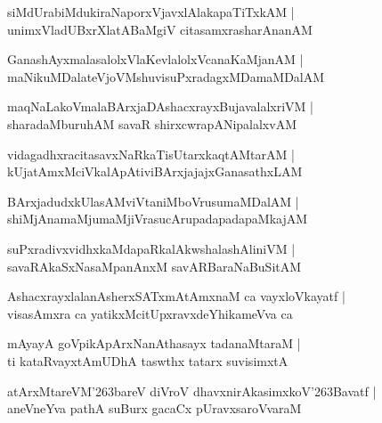 \documentclass[twoside,12pt,openright]{book}
\def\S{\char'263}
\newcounter{shloka}[chapter]
\begin{document}
\begin{shloka}%
siMdUrabiMdukiraNaporxVjavxlAlakapaTiTxkAM |\\
unimxVladUBxrXlatABaMgiV citasamxrasharAnanAM 
\end{shloka}

\begin{shloka}%
GanashAyxmalasalolxVlaKevlalolxVcanaKaMjanAM |\\
maNikuMDalateVjoVMshuvisuPxradagxMDamaMDalAM 
\end{shloka}

\begin{shloka}%
maqNaLakoVmalaBArxjaDAshacxrayxBujavalalxriVM |\\
sharadaMburuhAM savaR shirxcwrapANipalalxvAM
\end{shloka}

\begin{shloka}%
vidagadhxracitasavxNaRkaTisUtarxkaqtAMtarAM |\\
kUjatAmxMciVkalApAtiviBArxjajajxGanasathxLAM 
\end{shloka}

\begin{shloka}%
BArxjadudxkUlasAMviVtaniMboVrusumaMDalAM |\\
shiMjAnamaMjumaMjiVrasucArupadapadapaMkajAM 
\end{shloka}

\begin{shloka}%
suPxradivxvidhxkaMdapaRkalAkwshalashAliniVM |\\
savaRAkaSxNasaMpanAnxM savARBaraNaBuSitAM 
\end{shloka}

\begin{shloka}%
AshacxrayxlalanAsherxSATxmAtAmxnaM ca vayxloVkayatf |\\
visasAmxra ca yatikxMcitUpxravxdeYhikameVva ca 
\end{shloka}

\begin{shloka}%
mAyayA goVpikApArxNanAthasayx tadanaMtaraM |\\
ti kataRvayxtAmUDhA taswthx tatarx suvisimxtA 
\end{shloka}

\begin{shloka}%
atArxMtareVM\S bareV diVroV dhavxnirAkasimxkoV\S Bavatf |\\
aneVneYva pathA suBurx gacaCx pUravxsaroVvaraM 
\end{shloka}
\end{document}
